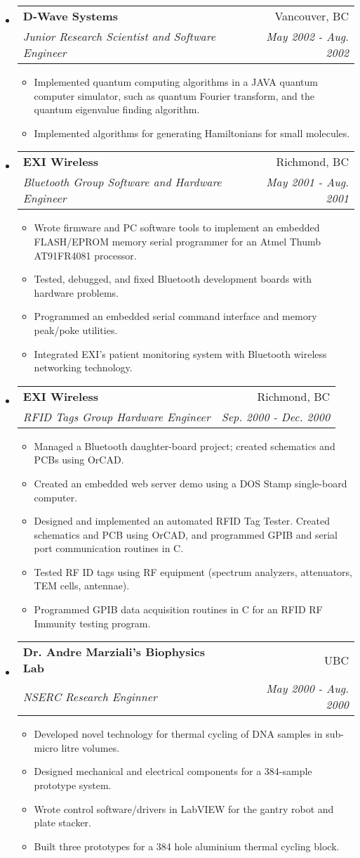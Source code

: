 \documentclass[letterpaper,11pt]{article}
\makeatletter
\newcommand{\resitem}[1]{\item #1 \vspace{-2pt}}
\newcommand{\resheading}[1]{{\large \parashade[.9]{sharpcorners}{\textbf{#1 \vphantom{p\^{E}}}}}}
\newcommand{\ressubheading}[4]{
\begin{tabular*}{6.5in}{l@{\extracolsep{\fill}}r}
		\textbf{#1} & #2 \\
		\textit{#3} & \textit{#4} \\
\end{tabular*}\vspace{-6pt}}
\makeatother
\begin{document}
\resheading{Work Experience}
\begin{itemize}
\item
	\ressubheading{D-Wave Systems}{Vancouver, BC}{Junior Research Scientist and Software Engineer}{May 2002 - Aug. 2002}
	\begin{itemize}
		\resitem{Implemented quantum computing algorithms in a JAVA quantum computer simulator, such as quantum Fourier transform, and the quantum eigenvalue finding algorithm.}
		\resitem{Implemented algorithms for generating Hamiltonians for small molecules.}
	\end{itemize}

\item 
	\ressubheading{EXI Wireless}{Richmond, BC}{Bluetooth Group Software and Hardware Engineer}{May 2001 - Aug. 2001}
	\begin{itemize}
		\resitem{Wrote firmware and PC software tools to implement an embedded FLASH/EPROM memory serial programmer for an Atmel Thumb AT91FR4081 processor.}
		\resitem{Tested, debugged, and fixed Bluetooth development boards with hardware problems.}
		\resitem{Programmed an embedded serial command interface and memory peak/poke utilities.}
		\resitem{Integrated EXI's patient monitoring system with Bluetooth wireless networking technology.}
	\end{itemize}

\item
	\ressubheading{EXI Wireless}{Richmond, BC}{RFID Tags Group Hardware Engineer}{Sep. 2000 - Dec. 2000}
	\begin{itemize}
		\resitem{Managed a Bluetooth daughter-board project; created schematics and PCBs using OrCAD.}
		\resitem{Created an embedded web server demo using a DOS Stamp single-board computer.}
		\resitem{Designed and implemented an automated RFID Tag Tester.  Created schematics and PCB using OrCAD, and programmed GPIB and serial port communication routines in C.}
		\resitem{Tested RF ID tags using RF equipment (spectrum analyzers, attenuators, TEM cells, antennae).}
		\resitem{Programmed GPIB data acquisition routines in C for an RFID RF Immunity testing program.}
	\end{itemize}

\item
	\ressubheading{Dr. Andre Marziali's Biophysics Lab}{UBC}{NSERC Research Enginner}{May 2000 - Aug. 2000}
	\begin{itemize}
		\resitem{Developed novel technology for thermal cycling of DNA samples in sub-micro litre volumes.}
		\resitem{Designed mechanical and electrical components for a 384-sample prototype system.}
		\resitem{Wrote control software/drivers in LabVIEW for the gantry robot and plate stacker.}
		\resitem{Built three prototypes for a 384 hole aluminium thermal cycling block.}
	\end{itemize}


\end{itemize}
\end{document}
